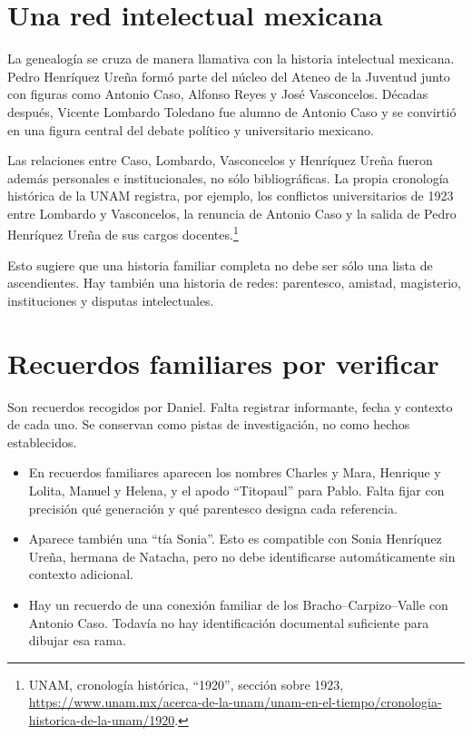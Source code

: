 \section{Una red intelectual mexicana}
\label{section-genealogia-red-intelectual}

La genealogía se cruza de manera llamativa con la
historia intelectual mexicana. Pedro Henríquez Ureña
formó parte del núcleo del Ateneo de la Juventud
junto con figuras como Antonio Caso, Alfonso Reyes
y José Vasconcelos. Décadas después, Vicente
Lombardo Toledano fue alumno de Antonio Caso y se
convirtió en una figura central del debate político
y universitario mexicano.

Las relaciones entre Caso, Lombardo, Vasconcelos y
Henríquez Ureña fueron además personales e
institucionales, no sólo bibliográficas. La propia
cronología histórica de la UNAM registra, por
ejemplo, los conflictos universitarios de 1923
entre Lombardo y Vasconcelos, la renuncia de
Antonio Caso y la salida de Pedro Henríquez Ureña
de sus cargos docentes.\footnote{%
UNAM, cronología histórica, ``1920'', sección sobre
1923,
\url{https://www.unam.mx/acerca-de-la-unam/unam-en-el-tiempo/cronologia-historica-de-la-unam/1920}.}

Esto sugiere que una historia familiar completa no
debe ser sólo una lista de ascendientes. Hay también
una historia de redes: parentesco, amistad,
magisterio, instituciones y disputas intelectuales.

\section{Recuerdos familiares por verificar}
\label{%
section-genealogia-recuerdos-familiares}

Son recuerdos recogidos por Daniel.
Falta registrar informante, fecha y contexto
de cada uno. Se conservan como pistas de
investigación, no como hechos establecidos.

\begin{itemize}
\item En recuerdos familiares aparecen los nombres
Charles y Mara, Henrique y Lolita, Manuel y Helena,
y el apodo ``Titopaul'' para Pablo. Falta fijar con
precisión qué generación y qué parentesco designa
cada referencia.
\item Aparece también una ``tía Sonia''. Esto es
compatible con Sonia Henríquez Ureña, hermana de
Natacha, pero no debe identificarse automáticamente
sin contexto adicional.
\item Hay un recuerdo de una conexión familiar de
los Bracho--Carpizo--Valle con Antonio Caso. Todavía
no hay identificación documental suficiente para
dibujar esa rama.
\end{itemize}

